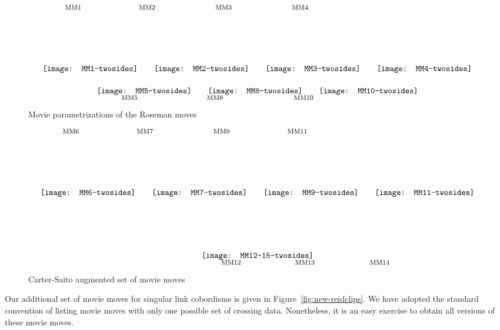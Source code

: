 \documentclass{amsart}\usepackage{amsfonts, amsmath, amssymb}\usepackage{graphicx, epic, epsf, enumerate, stmaryrd}
\theoremstyle{definition}
\numberwithin{equation}{section}
\begin{document}
\begin{figure}[ht]
\[\put(27, 70){\fontsize{8}{8}$\text{MM1}$} 
\put(117, 70){\fontsize{8}{8}$\text{MM2}$}
\put(210, 70){\fontsize{8}{8}$\text{MM3}$} 
\put(303, 70){\fontsize{8}{8}$\text{MM4}$}
\raisebox{-5pt}{\texttt{[image: MM1-twosides]}} \hspace{0.7cm} \raisebox{-5pt}{\texttt{[image: MM2-twosides]}} \hspace{0.7cm} \raisebox{-5pt}{\texttt{[image: MM3-twosides]}} \hspace{0.7cm} \raisebox{-5pt}{\texttt{[image: MM4-twosides]}} \]

\[\put(30, -13){\fontsize{8}{8}$\text{MM5}$} 
\put(134, -13){\fontsize{8}{8}$\text{MM8}$}
\put(240, -13){\fontsize{8}{8}$\text{MM10}$}
 \raisebox{-5pt}{\texttt{[image: MM5-twosides]}} \hspace{0.7cm} 
\raisebox{-5pt}{\texttt{[image: MM8-twosides]}} \hspace{0.7cm} 
\raisebox{-5pt}{\texttt{[image: MM10-twosides]}}
\]
\caption{Movie parametrizations of the Roseman moves}\label{fig:Roseman}
\end{figure}

\begin{figure}[ht]
\[\put(27, 70){\fontsize{8}{8}$\text{MM6}$} 
\put(117, 70){\fontsize{8}{8}$\text{MM7}$}
\put(210, 70){\fontsize{8}{8}$\text{MM9}$} 
\put(300, 70){\fontsize{8}{8}$\text{MM11}$} 
\raisebox{-5pt}{\texttt{[image: MM6-twosides]}} \hspace{0.7cm} 
\raisebox{-5pt}{\texttt{[image: MM7-twosides]}}  \hspace{0.7cm} 
\raisebox{-5pt}{\texttt{[image: MM9-twosides]}} \hspace{0.7cm}
\raisebox{-5pt}{\texttt{[image: MM11-twosides]}}\]

\[\put(24, -63){\fontsize{8}{8}$\text{MM12}$} 
\put(114, -63){\fontsize{8}{8}$\text{MM13}$}
\put(205, -63){\fontsize{8}{8}$\text{MM14}$}
\put(295, -63){\fontsize{8}{8}$\text{MM15}$}
\raisebox{-55pt}{\texttt{[image: MM12-15-twosides]}}\]
\caption{Carter-Saito augmented set of movie moves}\label{fig:Carter-Saito}
\end{figure}

Our additional set of movie moves for singular link cobordisms is given in Figure~\ref{fig:new-reidclips}. We have adopted the standard convention of listing movie moves with only one possible set of crossing data. Nonetheless, it is an easy exercise to obtain all versions of these movie moves.
\end{document}
